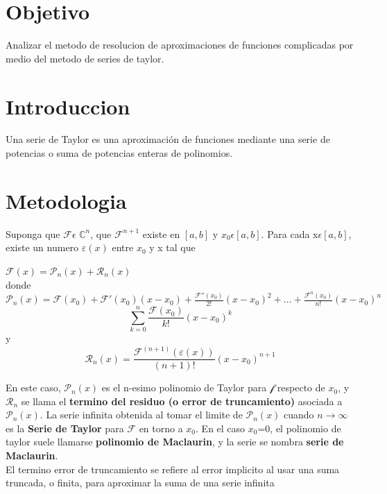 \documentclass{article}
\begin{document}
\begin{multicols}{2}

\section{Objetivo}
\label{sec:Obj}
Analizar el metodo de resolucion de aproximaciones de funciones complicadas por medio del metodo de series de taylor.

\section{Introduccion}
\label{Intro}
Una serie de Taylor es una aproximación de funciones mediante una serie de potencias o suma de potencias enteras de polinomios. 

\section{Metodologia}
\label{sec:Met}
Suponga que $\mathcal{F} \epsilon$ $\mathbb{C}^{n}$, que $\mathcal{F}^{n+1}$ existe en $[a,b]$ y $x_{0} \epsilon [a,b]$. Para cada x$\epsilon [a,b]$, existe un numero $\varepsilon (x)$ entre $x_{0}$ y x tal que 
\begin{center}
$\mathcal{F}(x)= \mathcal{P}_{n}(x) + \mathcal{R}_{n}(x)$
\\
donde 
\\
$\mathcal{P}_{n}(x) = \mathcal{F}(x_{0}) + \mathcal{F}'(x_{0})(x-x_{0})+\frac{\mathcal{F}''(x_{0})}{2!}(x-x_{0})^{2}+...+ \frac{\mathcal{F}^{n}(x_{0})}{n!}(x-x_{0})^{n}$
\\
\begin{equation}
\sum_{k=0}^{n} \frac{\mathcal{F}(x_{0})}{k!}(x-x_{0})^{k}
\end{equation}
y
\begin{equation}
\mathcal{R}_{n}(x)=\frac{\mathcal{F}^(n+1)(\varepsilon (x))}{(n+1)!}(x-x_{0})^{n+1}
\end{equation}

\end{center} 
En este caso, $\mathcal{P}_{n}(x)$ es el n-esimo polinomio de Taylor para $\mathcal{f}$ respecto de $x_{0}$, y $\mathcal{R}_{n}$ se llama el \textbf{termino del residuo (o error de truncamiento)} asociada a  $\mathcal{P}_{n}(x)$. La serie infinita obtenida al tomar el limite  de $\mathcal{P}_{n}(x)$ cuando $n \longrightarrow \infty$ es la \textbf{Serie de Taylor} para $\mathcal{F}$ en torno a $x_{0}$. En el caso $x_{0}$=0, el polinomio de taylor suele llamarse \textbf{polinomio de Maclaurin}, y la serie se nombra \textbf{serie de Maclaurin}.
\\
El termino error de truncamiento se refiere al error implicito al usar una suma truncada, o finita, para aproximar la suma de una serie infinita


\end{multicols}
\end{document}
